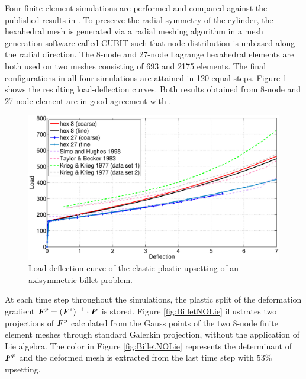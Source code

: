 \documentclass[12pt]{article}
\begin{document}
Four finite element simulations are performed and compared against the
published results in \citep{Krieg.Krieg:1977, Taylor.Becker:1983,
  Simo.Hughes:1998}.  To preserve the radial symmetry of the cylinder,
the hexahedral mesh is generated via a radial meshing algorithm in a
mesh generation software called CUBIT such that node distribution is
unbiased along the radial direction. The 8-node and 27-node Lagrange
hexahedral elements are both used on two meshes consisting of 693 and
2175 elements. The final configurations in all four simulations are
attained in 120 equal steps. Figure \ref{fig:LoadDeflection} shows the
resulting load-deflection curves. Both results obtained from 8-node
and 27-node element are in good agreement with
\citep{Krieg.Krieg:1977, Taylor.Becker:1983, Simo.Hughes:1998}.
\begin{figure}[htbp]
  \begin{center}
    \unitlength=1.0mm
      \includegraphics[width=160mm]{Load_Deflection.eps}
      \caption{Load-deflection curve of the elastic-plastic upsetting
        of an axisymmetric billet problem. }
    \label{fig:LoadDeflection}
  \end{center}
\end{figure}

At each time step throughout the simulations, the plastic split of the
deformation gradient ${\boldsymbol{F}}^{p} = ({\boldsymbol{F}}^{e})^{-1} \cdot {\boldsymbol{F}}$ is stored.
Figure \ref{fig:BilletNOLie} illustrates two projections of ${\boldsymbol{F}}^{p}$
calculated from the Gauss points of the two 8-node finite element
meshes through standard Galerkin projection, without the application
of Lie algebra. The color in Figure \ref{fig:BilletNOLie} represents
the determinant of ${\boldsymbol{F}}^{p}$ and the deformed mesh is extracted from
the last time step with $53\%$ upsetting.
\end{document}
